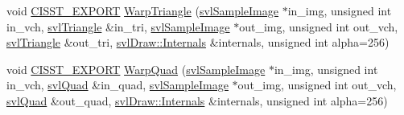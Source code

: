 \begin{DoxyCompactItemize}
\item 
void \hyperlink{cmn_export_macros_8h_a99393e0c3ac434b2605235bbe20684f8}{C\-I\-S\-S\-T\-\_\-\-E\-X\-P\-O\-R\-T} \hyperlink{namespacesvl_draw_a88641095e36010e2ef1c5cbbe187c444}{Warp\-Triangle} (\hyperlink{classsvl_sample_image}{svl\-Sample\-Image} $\ast$in\-\_\-img, unsigned int in\-\_\-vch, \hyperlink{structsvl_triangle}{svl\-Triangle} \&in\-\_\-tri, \hyperlink{classsvl_sample_image}{svl\-Sample\-Image} $\ast$out\-\_\-img, unsigned int out\-\_\-vch, \hyperlink{structsvl_triangle}{svl\-Triangle} \&out\-\_\-tri, \hyperlink{classsvl_draw_1_1_internals}{svl\-Draw\-::\-Internals} \&internals, unsigned int alpha=256)
\item 
void \hyperlink{cmn_export_macros_8h_a99393e0c3ac434b2605235bbe20684f8}{C\-I\-S\-S\-T\-\_\-\-E\-X\-P\-O\-R\-T} \hyperlink{namespacesvl_draw_a820a06892f8e009cbd25f3874d23c9ac}{Warp\-Quad} (\hyperlink{classsvl_sample_image}{svl\-Sample\-Image} $\ast$in\-\_\-img, unsigned int in\-\_\-vch, \hyperlink{structsvl_quad}{svl\-Quad} \&in\-\_\-quad, \hyperlink{classsvl_sample_image}{svl\-Sample\-Image} $\ast$out\-\_\-img, unsigned int out\-\_\-vch, \hyperlink{structsvl_quad}{svl\-Quad} \&out\-\_\-quad, \hyperlink{classsvl_draw_1_1_internals}{svl\-Draw\-::\-Internals} \&internals, unsigned int alpha=256)
\end{DoxyCompactItemize}


